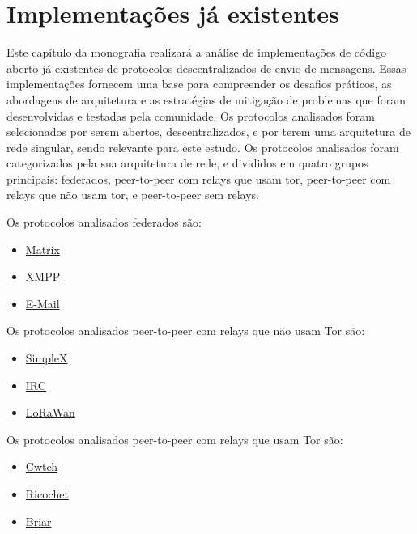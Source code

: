 
\chapter{Implementações já existentes}

Este capítulo da monografia realizará a análise de implementações de código aberto já existentes de protocolos descentralizados de envio de mensagens. Essas implementações fornecem uma base para compreender os desafios práticos, as abordagens de arquitetura e as estratégias de mitigação de problemas que foram desenvolvidas e testadas pela comunidade. Os protocolos analisados foram selecionados por serem abertos, descentralizados, e por terem uma arquitetura de rede singular, sendo relevante para este estudo. Os protocolos analisados foram categorizados pela sua arquitetura de rede, e divididos em quatro grupos principais: federados, peer-to-peer com relays que usam tor, peer-to-peer com relays que não usam tor, e peer-to-peer sem relays.

Os protocolos analisados federados são:
\begin{itemize}
  \item \href{https://matrix.org/}{Matrix}
  \item \href{https://xmpp.org/}{XMPP}
  \item \href{https://datatracker.ietf.org/doc/html/rfc5321}{E-Mail}
\end{itemize}

Os protocolos analisados peer-to-peer com relays que não usam Tor são:
\begin{itemize}
  \item \href{https://simplex.chat/}{SimpleX}
  \item \href{https://datatracker.ietf.org/doc/html/rfc2810}{IRC}
  \item \href{https://lora-alliance.org/}{LoRaWan}
\end{itemize}

Os protocolos analisados peer-to-peer com relays que usam Tor são:
\begin{itemize}
  \item \href{https://cwtch.im/}{Cwtch}
  \item \href{https://ricochet.im/}{Ricochet}
  \item \href{https://briarproject.org/}{Briar}
\end{itemize}

